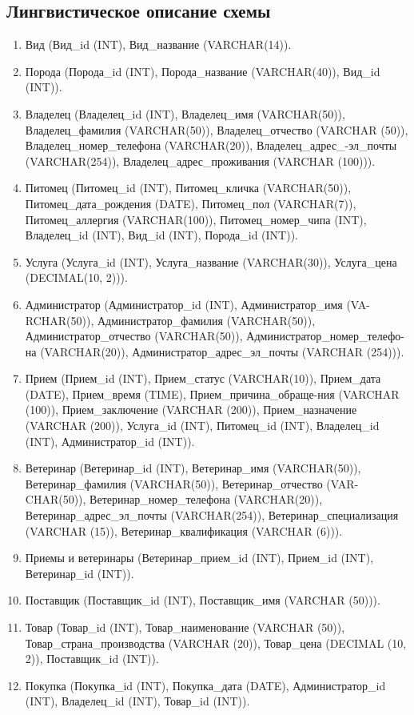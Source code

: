 \documentclass[a4paper]{article}
\begin{document}
\subsection{Лингвистическое описание схемы}

\begin{enumerate}
    \item Вид (Вид\_id (INT), Вид\_название (VARCHAR(14)).
    \item Порода (Порода\_id (INT), Порода\_название (VARCHAR(40)), Вид\_id (INT)).
    \item Владелец (Владелец\_id (INT), Владелец\_имя (VARCHAR(50)), Владелец\_фамилия (VARCHAR(50)), Владелец\_отчество (VARCHAR (50)), Владелец\_номер\_телефона 
 (VARCHAR(20)), Владелец\_адрес\_-эл\_почты (VARCHAR(254)), Владелец\_адрес\_проживания (VARCHAR (100))).
    \item Питомец (Питомец\_id (INT), Питомец\_кличка (VARCHAR(50)), Питомец\_дата\_рождения (DATE), Питомец\_пол (VARCHAR(7)), Питомец\_аллергия (VARCHAR(100)), Питомец\_номер\_чипа (INT), Владелец\_id (INT), Вид\_id (INT), Порода\_id (INT)).
    \item Услуга (Услуга\_id (INT), Услуга\_название (VARCHAR(30)), Услуга\_цена (DECIMAL(10, 2))).
    \item Администратор (Администратор\_id (INT), Администратор\_имя (VA-RCHAR(50)), Администратор\_фамилия (VARCHAR(50)), Администратор\_отчество (VARCHAR(50)), Администратор\_номер\_телефо-на (VARCHAR(20)), Администратор\_адрес\_эл\_почты (VARCHAR (254))).
    \item Прием (Прием\_id (INT), Прием\_статус (VARCHAR(10)), Прием\_дата (DATE), Прием\_время (TIME), Прием\_причина\_обраще-ния (VARCHAR (100)), Прием\_заключение (VARCHAR (200)), Прием\_назначение (VARCHAR (200)), Услуга\_id (INT), Питомец\_id (INT), Владелец\_id (INT), Администратор\_id (INT)).
    \item Ветеринар (Ветеринар\_id (INT), Ветеринар\_имя (VARCHAR(50)), Ветеринар\_фамилия (VARCHAR(50)), Ветеринар\_отчество (VAR-CHAR(50)), Ветеринар\_номер\_телефона (VARCHAR(20)), Ветеринар\_адрес\_эл\_почты (VARCHAR(254)), Ветеринар\_специализация (VARCHAR (15)), Ветеринар\_квалификация (VARCHAR (6))).
    \item Приемы и ветеринары (Ветеринар\_прием\_id (INT), Прием\_id (INT), Ветеринар\_id (INT)).
    \item Поставщик (Поставщик\_id (INT), Поставщик\_имя (VARCHAR (50))).
    \item Товар (Товар\_id (INT), Товар\_наименование (VARCHAR (50)), Товар\_страна\_производства (VARCHAR (20)), Товар\_цена (DECIMAL (10, 2)), Поставщик\_id (INT)).
    \item Покупка (Покупка\_id (INT), Покупка\_дата (DATE), Администратор\_id (INT), Владелец\_id (INT), Товар\_id (INT)).
\end{enumerate}
\end{document}
